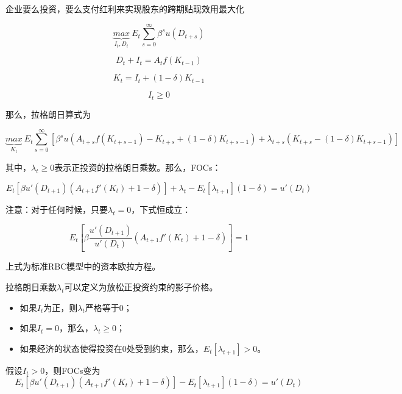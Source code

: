 \documentclass[cn,10pt,math=newtx,citestyle=gb7714-2015,bibstyle=gb7714-2015]{elegantbook}
\begin{document}
企业要么投资，要么支付红利来实现股东的跨期贴现效用最大化

\begin{equation}\label{label}
	\underbrace{max}_{I_t,D_t}~E_t\sum_{s=0}^{\infty}\beta^{s}u(D_{t+s})
\end{equation}

\begin{equation}\label{label}
	D_t+I_t=A_tf(K_{t-1})
\end{equation}

\begin{equation}\label{label}
	K_t=I_t+(1-\delta)K_{t-1}
\end{equation}

\begin{equation}\label{label}
	I_t\ge0
\end{equation}

那么，拉格朗日算式为

\begin{equation}\label{label}
	\underbrace{max}_{K_t}~E_t\sum_{s=0}^{\infty}[\beta^{s}u(A_{t+s}f(K_{t+s-1})-K_{t+s}+(1-\delta)K_{t+s-1})+\lambda_{t+s}(K_{t+s}-(1-\delta)K_{t+s-1})]
\end{equation}

其中，$\lambda_t\ge0$表示正投资的拉格朗日乘数。那么，FOCs：

\begin{equation}\label{label}
	E_t\left[\beta u'(D_{t+1})(A_{t+1}f'(K_t)+1-\delta)\right]+\lambda_t-E_t[\lambda_{t+1}](1-\delta)=u'(D_t)
\end{equation}

注意：对于任何时候，只要$\lambda_t=0$，下式恒成立：

\begin{equation}\label{label}
	E_t\left[\beta \frac{u'(D_{t+1})}{u'(D_t)}(A_{t+1}f'(K_t)+1-\delta)\right]=1
\end{equation}

上式为标准RBC模型中的资本欧拉方程。

拉格朗日乘数$\lambda_t$可以定义为放松正投资约束的影子价格。
\begin{itemize}
	\item 如果$I_t$为正，则$\lambda_t$严格等于0；
	\item 如果$I_t=0$，那么，$\lambda_t\ge0$；
	\item 如果经济的状态使得投资在0处受到约束，那么，$E_t[\lambda_{t+1}]>0$。
\end{itemize}

假设$I_t>0$，则FOCs变为
\begin{equation}\label{label}
	E_t\left[\beta u'(D_{t+1})(A_{t+1}f'(K_t)+1-\delta)\right]-E_t[\lambda_{t+1}](1-\delta)=u'(D_t)
\end{equation}
\end{document}
